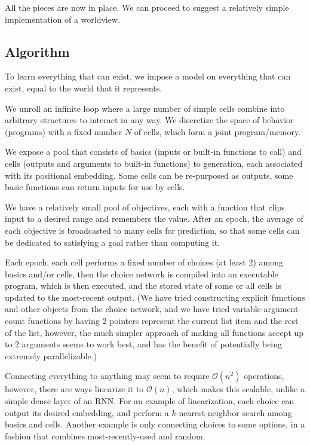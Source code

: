 \documentclass{article}
\begin{document}
All the pieces are now in place. We can proceed to suggest a relatively simple implementation of a worldview.

\subsection{Algorithm\label{Algorithm}}

To learn everything that can exist, we impose a model on everything that can exist, equal to the world that it represents.

We unroll an infinite loop where a large number of simple cells combine into arbitrary structures to interact in any way. We discretize the space of behavior (programs) with a fixed number $N$ of cells, which form a joint program/memory.

We expose a pool that consists of basics (inputs or built-in functions to call) and cells (outputs and arguments to built-in functions) to generation, each associated with its positional embedding. Some cells can be re-purposed as outputs, some basic functions can return inputs for use by cells.

We have a relatively small pool of objectives, each with a function that clips input to a desired range and remembers the value. After an epoch, the average of each objective is broadcasted to many cells for prediction, so that some cells can be dedicated to satisfying a goal rather than computing it.

Each epoch, each cell performs a fixed number of choices (at least 2) among basics and/or cells, then the choice network is compiled into an executable program, which is then executed, and the stored state of some or all cells is updated to the most-recent output. (We have tried constructing explicit functions and other objects from the choice network, and we have tried variable-argument-count functions by having 2 pointers represent the current list item and the rest of the list, however, the much simpler approach of making all functions accept up to 2 arguments seems to work best, and has the benefit of potentially being extremely parallelizable.)

Connecting everything to anything may seem to require $\mathcal{O}(n^2)$ operations, however, there are ways linearize it to $\mathcal{O}(n)$, which makes this scalable, unlike a simple dense layer of an RNN. For an example of linearization, each choice can output its desired embedding, and perform a $k$-nearest-neighbor search among basics and cells. Another example is only connecting choices to some options, in a fashion that combines most-recently-used and random.
\end{document}
